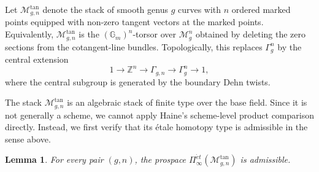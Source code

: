 \documentclass{amsart}
\newtheorem{lemma}[theorem]{Lemma}%
\theoremstyle{definition}
\numberwithin{equation}{section}
\begin{document}
Let $\mathcal M_{g,n}^{\tan}$ denote the stack of smooth genus $g$ curves with $n$ ordered marked points equipped with non-zero tangent vectors at the marked points. Equivalently, $\mathcal M_{g,n}^{\tan}$ is the $(\mathbb G_m)^n$-torsor over $\mathcal M_g^n$ obtained by deleting the zero sections from the cotangent-line bundles. Topologically, this replaces $\Gamma_g^n$ by the central extension
\[
1\longrightarrow \mathbb Z^n\longrightarrow \Gamma_{g,n}
\longrightarrow \Gamma_g^n\longrightarrow 1,
\]
where the central subgroup is generated by the boundary Dehn twists.

The stack $\mathcal M_{g,n}^{\tan}$ is an algebraic stack of finite type over the base field. Since it is not generally a scheme, we cannot apply Haine's scheme-level product comparison directly. Instead, we first verify that its étale homotopy type is admissible in the sense above.

\begin{lemma}\label{lemma:tangent-moduli-admissible}
For every pair $(g,n)$, the prospace
$\Pi_\infty^{\acute et}(\mathcal M_{g,n}^{\tan})$
is admissible.
\end{lemma}
\end{document}
